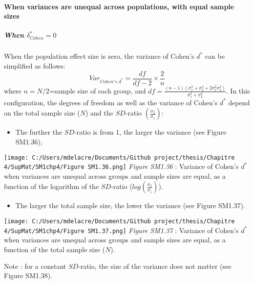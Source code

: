 \documentclass[
  english,
  man,mask,floatsintext]{apa6}
\providecommand{\tightlist}{%
  \setlength{\itemsep}{0pt}\setlength{\parskip}{0pt}}
\let\oldparagraph\paragraph
\renewcommand{\paragraph}[1]{\oldparagraph{#1}\mbox{}}
\let\oldsubparagraph\subparagraph
\renewcommand{\subparagraph}[1]{\oldsubparagraph{#1}\mbox{}}
\begin{document}
\hypertarget{when-variances-are-unequal-across-populations-with-equal-sample-sizes-3}{%
\paragraph{When variances are unequal across populations, with equal sample sizes}\label{when-variances-are-unequal-across-populations-with-equal-sample-sizes-3}}

\hypertarget{when-delta_cohen-0-1}{%
\subparagraph{\texorpdfstring{When \(\delta^*_{Cohen} = 0\)}{When \textbackslash delta\^{}*\_\{Cohen\} = 0}}\label{when-delta_cohen-0-1}}

When the population effect size is zero, the variance of Cohen's \(d^*\) can be simplified as follows:
\[Var_{Cohen's \; d^*} = \frac{df}{df-2} \times \frac{2}{n}\]
where \(n=N/2\)=sample size of each group, and \(df=\frac{(n-1)(\sigma^4_1+\sigma^4_2+2\sigma^2_1\sigma^2_2)}{\sigma^4_1+\sigma^4_2}\). In this configuration, the degrees of freedom as well as the variance of Cohen's \(d^*\) depend on the total sample size (\(N\)) and the \(SD\)-ratio \(\left( \frac{\sigma_2}{\sigma_1}\right)\):

\begin{itemize}
\tightlist
\item
  The further the \(SD\)-ratio is from 1, the larger the variance (see Figure SM1.36);
\end{itemize}

\texttt{[image: C:/Users/mdelacre/Documents/Github project/thesis/Chapitre 4/SupMat/SM1chp4/Figure SM1.36.png]}
\emph{Figure SM1.36} : Variance of Cohen's \(d^*\) when variances are unequal across groups and sample sizes are equal, as a function of the logarithm of the \(SD\)-ratio (\(log \left( \frac{\sigma_2}{\sigma_1} \right)\)).

\newpage

\begin{itemize}
\tightlist
\item
  The larger the total sample size, the lower the variance (see Figure SM1.37).
\end{itemize}

\texttt{[image: C:/Users/mdelacre/Documents/Github project/thesis/Chapitre 4/SupMat/SM1chp4/Figure SM1.37.png]}
\emph{Figure SM1.37} : Variance of Cohen's \(d^*\) when variances are unequal across groups and sample sizes are equal, as a function of the total sample size (\(N\)).

\newpage

Note : for a constant \(SD\)-ratio, the size of the variance does not matter (see Figure SM1.38).
\end{document}
